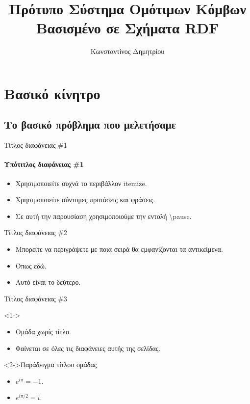 \documentclass[greek]{beamer}
\title[Πρότυπο Σύστημα Ομότιμων Κόμβων Βασισμένο σε Σχήματα \textlatin{RDF}]{Πρότυπο Σύστημα Ομότιμων Κόμβων\\ Βασισμένο σε Σχήματα \textlatin{RDF}}
\author[Κ. Δημητρίου]{Κωνσταντίνος Δημητρίου}
\begin{document}
	\typesetFrontSlides


\section{Βασικό κίνητρο}

\subsection[Βασικό Πρόβλημα]{Το βασικό πρόβλημα που μελετήσαμε}

\begin{frame}{Τίτλος διαφάνειας \textlatin{\#}1}
	\framesubtitle{Υπότιτλος διαφάνειας \textlatin{\#}1}
	\begin{itemize}
		\item Χρησιμοποιείτε συχνά το περιβάλλον \textlatin{itemize}.
		\pause
		\item Χρησιμοποιείτε σύντομες προτάσεις και φράσεις.
		\pause
		\item Σε αυτή την παρουσίαση χρησιμοποιούμε την εντολή \textlatin{\textbackslash{}pause}.
	\end{itemize}
\end{frame}

\begin{frame}{Τίτλος διαφάνειας \textlatin{\#}2}
	\begin{itemize}
		\item <1->Μπορείτε να περιγράψετε με ποια σειρά θα εμφανίζονται τα αντικείμενα.
		\item <3->Όπως εδώ.
		\item <2->Αυτό είναι το δεύτερο.
	\end{itemize}
\end{frame}

\begin{frame}{Τίτλος διαφάνειας \textlatin{\#}3}
	\begin{block}
		<1->{}
		\begin{itemize}
			\item Ομάδα χωρίς τίτλο.
			\item Φαίνεται σε όλες τις διαφάνειες αυτής της σελίδας.
		\end{itemize}
	\end{block}
	\begin{exampleblock}
		<2->{Παράδειγμα τίτλου ομάδας}
		\begin{itemize}
			\item $e^{i\pi}=-1$.
			\item $e^{i\pi/2}=i$.
		\end{itemize}
	\end{exampleblock}
\end{frame}
\end{document}
